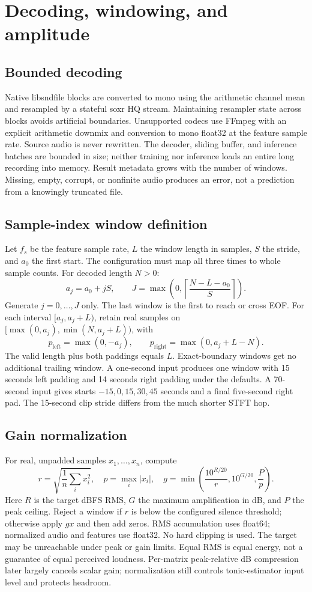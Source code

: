 \documentclass[11pt,a4paper]{article}
\begin{document}
\section{Decoding, windowing, and amplitude}
\subsection{Bounded decoding}
Native libsndfile blocks are converted to mono using the arithmetic channel mean
and resampled by a stateful soxr HQ stream. Maintaining resampler state across
blocks avoids artificial boundaries. Unsupported codecs use FFmpeg with an
explicit arithmetic downmix and conversion to mono float32 at the feature sample
rate. Source audio is never rewritten. The decoder, sliding buffer, and inference
batches are bounded in size; neither training nor inference loads an entire
long recording into memory. Result metadata grows with the number of windows.
Missing, empty, corrupt, or nonfinite audio produces an error, not a prediction
from a knowingly truncated file.

\subsection{Sample-index window definition}
Let $f_s$ be the feature sample rate, $L$ the window length in samples,
$S$ the stride, and $a_0$ the first start. The configuration must map all three
times to whole sample counts. For decoded length $N>0$:
\[
a_j=a_0+jS,\qquad
J=\max\left(0,\left\lceil\frac{N-L-a_0}{S}\right\rceil\right).
\]
Generate $j=0,\ldots,J$ only. The last window is the first to reach or cross EOF.
For each interval $[a_j,a_j+L)$, retain real samples on
$[\max(0,a_j),\min(N,a_j+L))$, with
\[
p_{\mathrm{left}}=\max(0,-a_j),\qquad
p_{\mathrm{right}}=\max(0,a_j+L-N).
\]
The valid length plus both paddings equals $L$. Exact-boundary windows get no
additional trailing window. A one-second input produces one window with
15 seconds left padding and 14 seconds right padding under the defaults.
A 70-second input gives starts $-15,0,15,30,45$ seconds and a final five-second
right pad. The 15-second clip stride differs from the much shorter STFT hop.

\subsection{Gain normalization}
For real, unpadded samples $x_1,\ldots,x_n$, compute
\[
r=\sqrt{\frac1n\sum_i x_i^2},\quad p=\max_i|x_i|,\quad
g=\min\left(\frac{10^{R/20}}r,10^{G/20},\frac{P}p\right).
\]
Here $R$ is the target dBFS RMS, $G$ the maximum amplification in dB, and $P$
the peak ceiling. Reject a window if $r$ is below the configured silence
threshold; otherwise apply $gx$ and then add zeros. RMS accumulation uses
float64; normalized audio and features use float32. No hard clipping is used.
The target may be unreachable under peak or gain limits. Equal RMS is equal
energy, not a guarantee of equal perceived loudness. Per-matrix peak-relative dB
compression later largely cancels scalar gain; normalization still controls
tonic-estimator input level and protects headroom.
\end{document}
